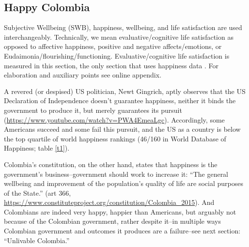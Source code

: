 \documentclass[10pt, letterpaper]{article}
\begin{document}
\begin{spacing}{2}
\section{Happy Colombia}

Subjective Wellbeing (SWB), happiness, wellbeing, and life satisfaction are used 
interchangeably. Technically, we mean evaluative/cognitive life satisfaction as
opposed to affective happiness, positive and negative affects/emotions, or
Eudaimonia/flourishing/functioning. Evaluative/cognitive life satisfaction is measured in this section, the only section that uses happiness
data%
.    
 For elaboration and auxiliary points see online appendix.

A revered (or despised) US politician, Newt Gingrich, aptly observes that the US Declaration of Independence doesn't
guarantee happiness, neither it binds the government to produce it, but 
merely guarantees its pursuit (\url{https://www.youtube.com/watch?v=PWA4EmeaLgc}). Accordingly, some Americans succeed and some fail
this pursuit, and the US as a country is below the top quartile
of world happiness rankings (46/160 in World Database of Happiness; table \ref{t1}).

Colombia's constitution, on the other hand, states that happiness is the
government's business--government should work to increase it: ``The general wellbeing and
improvement of the population's quality of life are social purposes of the
State.'' (art 366, \url{https://www.constituteproject.org/constitution/Colombia_2015}). 
 And Colombians are indeed very happy, happier than Americans, but
arguably not because of the Colombian government, rather despite it--in multiple ways Colombian government and outcomes it produces
are a failure--see next section: ``Unlivable Colombia.''   


\end{spacing}
\end{document}
